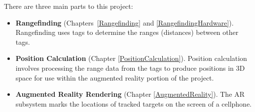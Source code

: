 There are three main parts to this project: 
\begin{itemize}
	\item \textbf{Rangefinding} (Chapters~\ref{Rangefinding} and \ref{RangefindingHardware}). Rangefinding uses tags to determine the ranges (distances) between other tags.
	\item \textbf{Position Calculation} (Chapter \ref{PositionCalculation}). Position calculation involves processing the range data from the tags to produce positions in 3D space for use within the augmented reality portion of the project.
	\item \textbf{Augmented Reality Rendering} (Chapter \ref{AugmentedReality}). The AR subsystem marks the locations of tracked targets on the screen of a cellphone.
\end{itemize}

